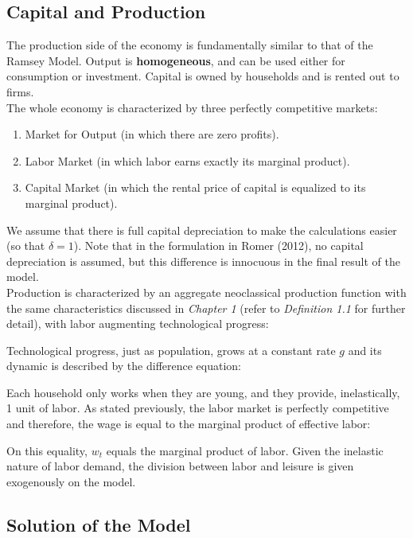 \subsection{Capital and Production}

The production side of the economy is fundamentally similar to that of the Ramsey Model. Output is \textbf{homogeneous}, and can be used either for consumption or investment. Capital is owned by households and is rented out to firms.\\

The whole economy is characterized by three perfectly competitive markets:
\begin{enumerate}
\item Market for Output (in which there are zero profits).
\item Labor Market (in which labor earns exactly its marginal product).
\item Capital Market (in which the rental price of capital is equalized to its marginal product).
\end{enumerate}

We assume that there is full capital depreciation to make the calculations easier (so that $\delta=1$). Note that in the formulation in Romer (2012), no capital depreciation is assumed, but this difference is innocuous in the final result of the model.\\

Production is characterized by an aggregate neoclassical production function with the same characteristics discussed in \textit{Chapter 1} (refer to \textit{Definition 1.1} for further detail), with labor augmenting technological progress:

\bigskip
Technological progress, just as population, grows at a constant rate $g$ and its dynamic is described by the difference equation:

\bigskip
Each household only works when they are young, and they provide, inelastically, 1 unit of labor. As stated previously, the labor market is perfectly competitive and therefore, the wage is equal to the marginal product of effective labor:

\bigskip
On this equality, $w_t$ equals the marginal product of labor. Given the inelastic nature of labor demand, the division between labor and leisure is given exogenously on the model.

\subsection{Solution of the Model}

